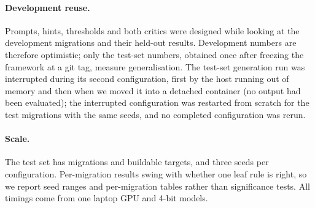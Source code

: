 \paragraph{Development reuse.} Prompts, hints, thresholds and both critics were designed while looking at the
development migrations and their held-out results. Development numbers are therefore optimistic; only the test-set
numbers, obtained once after freezing the framework at a git tag, measure generalisation. The test-set
generation run was interrupted during its second configuration, first by the host running out of memory and
then when we moved it into a detached container (no output had been evaluated); the interrupted configuration was
restarted from scratch for the test migrations with the same seeds, and no completed
configuration was rerun.

\paragraph{Scale.} The test set has \testMigrations{} migrations and \testBuildable{} buildable targets, and three
seeds per configuration. Per-migration results swing with whether one leaf rule is right, so we report seed ranges
and per-migration tables rather than significance tests. All timings come from one laptop GPU and 4-bit models.
